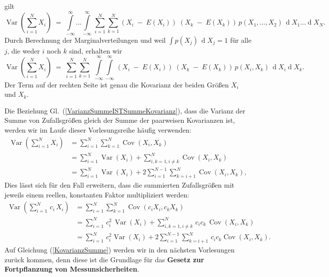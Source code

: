 gilt
\begin{equation}
\operatorname {Var}\left(\sum _{{i=1}}^{N}X_{i}\right) \; = \;
\int\limits_{-\infty}^{\infty} \dots \int\limits_{-\infty}^{\infty}
\, \sum_{i=1}^N \sum_{k=1}^N  \left(X_i \; - \; E(X_i)\right) \;
\left(X_k \; - \; E(X_k)\right) \, p(X_1, \dots, X_2)
\, \operatorname{d}X_1 \dots \operatorname{d}X_N .
\end{equation}
Durch Berechnung der Marginalverteilungen und weil $\int p(X_j) \, \operatorname{d}X_j = 1$
für alle $j$, die weder $i$ noch $k$ sind, erhalten wir
\begin{equation}
\operatorname {Var}\left(\sum _{{i=1}}^{N}X_{i}\right) \; = \;
\sum_{i=1}^N \sum_{k=1}^N  \;
\int\limits_{-\infty}^{\infty} \int\limits_{-\infty}^{\infty}
\, \left(X_i \; - \; E(X_i)\right) \;
\left(X_k \; - \; E(X_k)\right) \, p(X_i, X_k)
\, \operatorname{d}X_i \operatorname{d}X_k .
\end{equation}
Der Term auf der rechten Seite ist genau die Kovarianz der beiden 
Größen $X_i$ und $X_k$.

Die Beziehung Gl.~(\ref{VarianzSummeISTSummeKovarianz}), dass die
Varianz der Summe von Zufallsgrößen gleich der Summe der paarweisen Kovarianzen
ist, werden wir im Laufe dieser Vorlesungsreihe häufig
verwenden:
\begin{equation}
{\begin{aligned}\operatorname {Var}\left(\sum _{{i=1}}^{N}X_{i}\right) & 
	= \sum _{i=1}^{N}\sum _{k=1}^{N}\operatorname {Cov}(X_{i},X_{k})\\
	& = \sum _{{i=1}}^{N}\operatorname {Var}(X_{i})+
	\sum _{{i,k=1,i\neq k}}^{N}\operatorname {Cov}(X_{i},X_{k})\\
	& = \sum _{i=1}^{N}\operatorname {Var}(X_{i})+2\sum _{{i=1}}^{{N-1}}
	\sum _{k=i+1}^{N}\operatorname {Cov}(X_{i},X_{k}) ,
	\end{aligned}}
\label{VarianzSummeX2Kovarianz}
\end{equation}
Dies lässt sich für den Fall erweitern, dass die summierten Zufallsgrößen mit jeweils einem reellen,
konstanten Faktor multipliziert werden:
\begin{equation}
{\begin{aligned}\operatorname {Var}\left(\sum _{{i=1}}^{N} \, c_i \, X_{i}\right) & 
	= \sum _{i=1}^{N}\sum _{k=1}^{N}\operatorname {Cov}(c_i X_{i}, c_k X_{k})\\
	& = \sum _{{i=1}}^{N} \, c_i^2 \, \operatorname {Var}(X_{i})+
	\sum _{{i,k=1,i\neq k}}^{N} \, c_i c_k \,  \operatorname {Cov}(X_{i},X_{k})\\
	& = \sum _{{i=1}}^{N} \, c_i^2 \operatorname {Var}(X_{i})+2\sum _{{i=1}}^{{N-1}}
	\sum _{{k=i+1}}^{N} \, c_i c_k \operatorname {Cov}(X_{i},X_{k}).
	\end{aligned}}
\label{KovarianzSumme}
\end{equation}
Auf Gleichung (\ref{KovarianzSumme}) werden wir in den nächsten Vorlesungen zurück kommen,
denn diese ist die Grundlage für das \textbf{Gesetz zur Fortpflanzung von Messunsicherheiten}.

